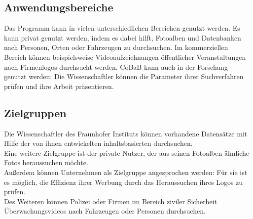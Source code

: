 \subsection{Anwendungsbereiche}

Das Programm kann in vielen unterschiedlichen Bereichen genutzt werden. Es kann privat genutzt werden, indem es dabei hilft, Fotoalben und Datenbanken nach Personen, Orten oder Fahrzeugen zu durchsuchen.
Im kommerziellen Bereich können beispielsweise Videoaufzeichnungen öffentlicher Veranstaltungen nach Firmenlogos durchsucht werden.
CoBaB kann auch in der Forschung genutzt werden: Die Wissenschaftler können die Parameter ihrer \gls{Suchverfahren} prüfen und ihre Arbeit präsentieren.

\subsection{Zielgruppen}

Die Wissenschaftler des Fraunhofer Instituts können vorhandene Datensätze mit Hilfe der von ihnen entwickelten inhaltsbasierten  durchsuchen.\\
Eine weitere Zielgruppe ist der private Nutzer, der aus seinen Fotoalben ähnliche Fotos heraussuchen möchte.\\
Außerdem können Unternehmen als Zielgruppe angesprochen werden: Für sie ist es möglich, die Effizienz ihrer Werbung durch das Heraussuchen ihres Logos zu prüfen.\\
Des Weiteren können Polizei oder Firmen im Bereich ziviler Sicherheit Überwachungsvideos nach Fahrzeugen oder Personen durchsuchen.
\pagebreak